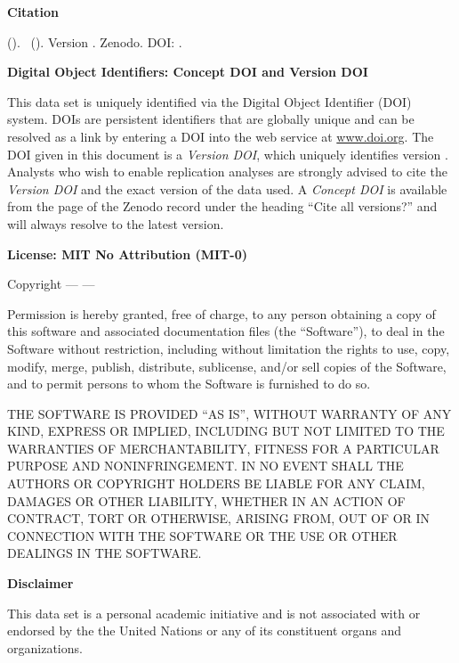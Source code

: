 \textbf{Citation}

\emph{\projectauthor} (\the\year ). \softwaretitle\ (\softwareshort ). Version \version . Zenodo. DOI: \softwareversiondoi .

\vspace{0.5cm}

\textbf{Digital Object Identifiers: Concept DOI and Version DOI}

This data set is uniquely identified via the Digital Object Identifier (DOI) system. DOIs are persistent identifiers that are globally unique and can be resolved as a link by entering a DOI into the web service at \url{www.doi.org}. The DOI given in this document is a \emph{Version DOI}, which uniquely identifies version \version. Analysts who wish to enable replication analyses are strongly advised to cite the \emph{Version DOI} and the exact version of the data used. A \emph{Concept DOI} is available from the page of the Zenodo record under the heading \enquote{Cite all versions?} and will always resolve to the latest version.

\vspace{0.5cm}



\textbf{License: MIT No Attribution (MIT-0)}

Copyright --- \the\year --- \projectauthor

Permission is hereby granted, free of charge, to any person obtaining a copy of this software and associated documentation files (the \enquote{Software}), to deal in the Software without restriction, including without limitation the rights to use, copy, modify, merge, publish, distribute, sublicense, and/or sell copies of the Software, and to permit persons to whom the Software is furnished to do so.

 
THE SOFTWARE IS PROVIDED \enquote{AS IS}, WITHOUT WARRANTY OF ANY KIND, EXPRESS OR IMPLIED, INCLUDING BUT NOT LIMITED TO THE WARRANTIES OF MERCHANTABILITY, FITNESS FOR A PARTICULAR PURPOSE AND NONINFRINGEMENT. IN NO EVENT SHALL THE AUTHORS OR COPYRIGHT HOLDERS BE LIABLE FOR ANY CLAIM, DAMAGES OR OTHER LIABILITY, WHETHER IN AN ACTION OF CONTRACT, TORT OR OTHERWISE, ARISING FROM, OUT OF OR IN CONNECTION WITH THE SOFTWARE OR THE USE OR OTHER DEALINGS IN THE SOFTWARE. 

\vspace{0.5cm}

\textbf{Disclaimer} 

This data set is a personal academic initiative and is not associated with or endorsed by the the United Nations or any of its constituent organs and organizations.


\newpage